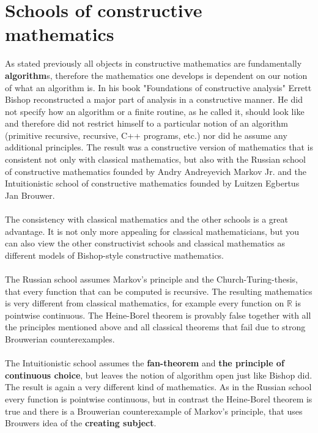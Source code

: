 \documentclass[11pt,a4paper,leqno]{report}
\numberwithin{equation}{chapter}
\begin{document}
\section{Schools of constructive mathematics}
As stated previously all objects in constructive mathematics are fundamentally\textbf{ algorithm}s, therefore the mathematics one develops is dependent on our notion of what an algorithm is. In his book "Foundations of constructive analysis" Errett Bishop reconstructed a major part of analysis in a constructive manner. He did not specify how an algorithm or a finite routine, as he called it, should look like and therefore did not restrict himself to a particular notion of an algorithm (primitive recursive, recursive, C++ programs, etc.) nor did he assume any additional principles. The result was a constructive version of mathematics that is consistent not only with classical mathematics, but also with the Russian school of constructive mathematics founded by Andry Andreyevich Markov Jr. and the Intuitionistic school of constructive mathematics founded by Luitzen Egbertus Jan Brouwer.\\
\\
The consistency with classical mathematics and the other schools is a great advantage. It is not only more appealing for classical mathematicians, but you can also view the other constructivist schools and classical mathematics as different models of Bishop-style constructive mathematics. \\
\\
The Russian school assumes Markov's principle and the Church-Turing-thesis, that every function that can be computed is recursive. The resulting mathematics is very different from classical mathematics, for example every function on $\mathbb{R}$ is pointwise continuous. The Heine-Borel theorem is provably false together with all the principles mentioned above and all classical theorems that fail due to strong Brouwerian counterexamples.\\
\\
The Intuitionistic school assumes the \textbf{fan-theorem} and \textbf{the principle of continuous choice}, but leaves the notion of algorithm open just like Bishop did. The result is again a very different kind of mathematics. As in the Russian school every function is pointwise continuous, but in contrast the Heine-Borel theorem is true and there is a Brouwerian counterexample of Markov's principle, that uses Brouwers idea of the \textbf{creating subject}\cite{VAR}.
\\
\end{document}
